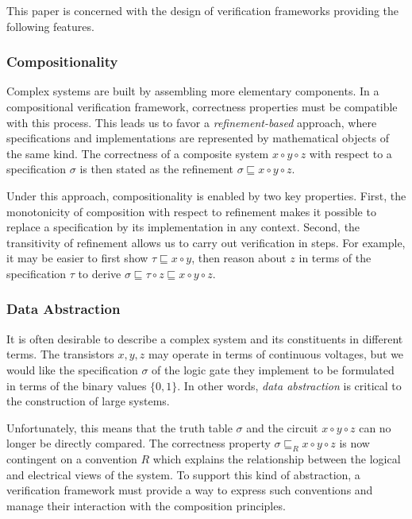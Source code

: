 \documentclass[acmsmall,screen,review,anonymous]{acmart}
\begin{document}
This paper is concerned with
the design of verification frameworks
providing the following features.

\subsubsection{Compositionality} %

Complex systems are built by assembling more elementary components.
In a compositional verification framework,
correctness properties must be compatible with this process.
This leads us to favor a \emph{refinement-based} approach,
where specifications and implementations
are represented by mathematical objects of the same kind.
The correctness of a composite system $x \circ y \circ z$
with respect to a specification $\sigma$
is then stated as the refinement
$\sigma \sqsubseteq x \circ y \circ z$.

Under this approach,
compositionality is enabled by two key properties.
First,
the monotonicity of composition
with respect to refinement
makes it possible to replace a specification by its implementation
in any context.
Second,
the transitivity of refinement
allows us to carry out verification in steps.
For example,
it may be easier to first show
$\tau \sqsubseteq x \circ y$,
then reason about $z$ in terms of the specification $\tau$
to derive
$\sigma \sqsubseteq \tau \circ z \sqsubseteq x \circ y \circ z$.


\subsubsection{Data Abstraction} %

It is often desirable to describe a complex system
and its constituents in different terms.
The transistors $x, y, z$ may operate in terms of continuous voltages,
but we would like the specification $\sigma$
of the logic gate they implement
to be formulated in terms of the binary values $\{0, 1\}$.
In other words,
\emph{data abstraction} is critical to the construction of large systems.

Unfortunately,
this means that the truth table $\sigma$
and the circuit $x \circ y \circ z$
can no longer be directly compared.
The correctness property $\sigma \sqsubseteq_R x \circ y \circ z$
is now contingent on a convention $R$
which explains the relationship between
the logical and electrical views of the system.
To support this kind of abstraction,
a verification framework must provide a way to express
such conventions
and manage their interaction with the composition principles.
\end{document}
